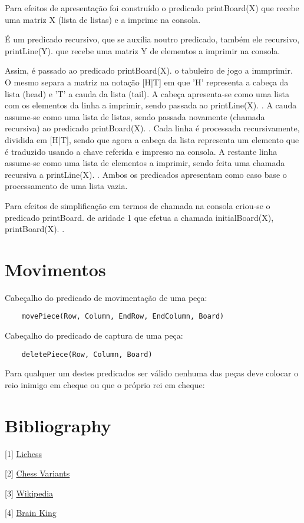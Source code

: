 \documentclass[12pt]{article}
\begin{document}
Para efeitos de apresentação foi construído o predicado printBoard(X) que recebe uma matriz X (lista de listas) e a imprime na consola.

É um predicado recursivo, que se auxilia noutro predicado, também ele recursivo, printLine(Y). que recebe uma matriz Y de elementos a imprimir na consola.

Assim, é passado ao predicado printBoard(X). o tabuleiro de jogo a immprimir. O mesmo separa a matriz na notação [H|T] em que 'H' representa a cabeça da lista (head) e 'T' a cauda da lista (tail). A cabeça apresenta-se como uma lista com os elementos da linha a imprimir, sendo passada ao printLine(X). . A cauda assume-se como uma lista de listas, sendo passada novamente (chamada recursiva) ao predicado printBoard(X). . Cada linha é processada recursivamente, dividida em [H|T], sendo que agora a cabeça da lista representa um elemento que é traduzido usando a chave referida e impresso na consola. A restante linha assume-se como uma lista de elementos a imprimir, sendo feita uma chamada recursiva a printLine(X). . Ambos os predicados apresentam como caso base o processamento de uma lista vazia.

Para efeitos de simplificação em termos de chamada na consola criou-se o predicado printBoard. de aridade 1
que efetua a chamada initialBoard(X), printBoard(X). .

\section{Movimentos}

Cabeçalho do predicado de movimentação de uma peça:
\begin{lstlisting}
	movePiece(Row, Column, EndRow, EndColumn, Board)
\end{lstlisting}
Cabeçalho do predicado de captura de uma peça:
\begin{lstlisting}
	deletePiece(Row, Column, Board)
\end{lstlisting}
Para qualquer um destes predicados ser válido nenhuma das peças deve colocar o reio inimigo em cheque ou que o próprio rei em cheque:


\section{Bibliography}

%

[1] \href{https://lichess.org/variant/racingKings}{Lichess}

[2] \href{http://www.chessvariants.com/diffobjective.dir/racing.html}{Chess Variants}

[3] \href{https://en.wikipedia.org/wiki/V._R._Parton#Racing_Kings}{Wikipedia}

[4] \href{http://brainking.com/pt/GameRules?tp=125}{Brain King}
\end{document}
